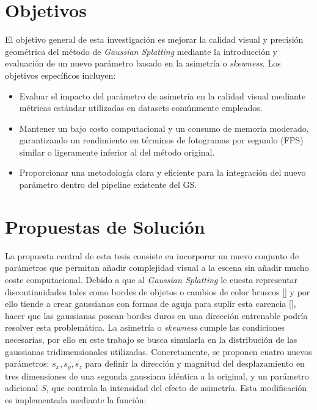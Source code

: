 \section{Objetivos}
El objetivo general de esta investigación es mejorar la calidad visual y precisión geométrica del método de \textit{Gaussian Splatting} mediante la 
introducción y evaluación de un nuevo parámetro basado en la asimetría o \textit{skewness}. Los objetivos específicos incluyen:
\begin{itemize}
    \item Evaluar el impacto del parámetro de asimetría en la calidad visual mediante métricas estándar utilizadas en datasets comúnmente empleados.
    \item Mantener un bajo costo computacional y un consumo de memoria moderado, garantizando un rendimiento en términos de fotogramas por segundo (FPS) 
    similar o ligeramente inferior al del método original.
    \item Proporcionar una metodología clara y eficiente para la integración del nuevo parámetro dentro del pipeline existente del GS.
\end{itemize}

\section{Propuestas de Solución}
La propuesta central de esta tesis consiste en incorporar un nuevo conjunto de parámetros que permitan añadir complejidad visual a la escena sin añadir
mucho coste computacional. Debido a que al \textit{Gaussian Splatting} le cuesta representar discontinuidades tales como bordes de objetos o cambios
de color bruscos [\cite{qu2024discgsdiscontinuityawaregaussiansplatting}] y por ello tiende a crear gaussianas con formas de aguja para suplir esta carencia
[\cite{hyung2024effectiverankanalysisregularization, huang2024spectralgstaming3dgaussian,yu2023mipsplattingaliasfree3dgaussian}], hacer que las gaussianas posean bordes duros en una dirección entrenable podría resolver esta problemática.    
La asimetría o \textit{skewness} cumple las condiciones necesarias, por ello en este trabajo se busca simularla en la distribución de las 
gaussianas tridimensionales utilizadas. Concretamente, se proponen cuatro nuevos parámetros: $s_x, s_y, s_z$ para definir 
la dirección y magnitud del desplazamiento en tres dimensiones de una segunda gaussiana idéntica a la original, y un parámetro adicional $S$, que 
controla la intensidad del efecto de asimetría. Esta modificación es implementada mediante la función:


